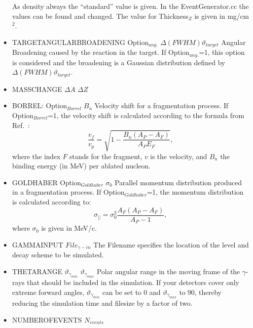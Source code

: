\documentclass[12pt]{book}
\begin{document}
\begin{itemize}
  As density always the ``standard'' value is given. In the EventGenerator.cc the values can be found and changed.
  The value for Thickness$_{Z}$ is given in mg/cm$^{2}$.
\item TARGETANGULARBROADENING Option$_{ang.}$ $\Delta (FWHM) \vartheta_{target}$\hfill{} \linebreak 
  Angular Broadening caused by the reaction in the target. If Option$_{ang.}$=1,
  this option is considered and the broadening is a Gaussian distribution defined by $\Delta (FWHM) \vartheta_{target}$.
\item MASSCHANGE $\Delta A$ $\Delta Z$\hfill{} \linebreak
\item BORREL: Option$_{Borrel}$ $B_{n}$\hfill{} \linebreak
  Velocity shift for a fragmentation process. If Option$_{Borrel}$=1, the velocity shift is calculated according
  to the formula from Ref.~\cite{BORREL}:
  \begin{equation}
    \frac{v_{f}}{v_{p}} = \sqrt{1-\frac{B_{n}(A_{P}-A_{F})}{A_{P}E_{F}}},
  \end{equation}
  where the index $F$ stands for the fragment,  $v$ is the velocity, 
  and $B_n$ the binding energy (in MeV) per ablated nucleon.
\item GOLDHABER Option$_{Goldhaber}$ $\sigma_{0}$\hfill{} \linebreak
  Parallel momentum distribution produced in a fragmentation process. If Option$_{Goldhaber}$=1, the momentum 
  distribution is calculated according to: 
  \begin{equation}
    \sigma_{||}=\sigma_{0}^{2} \frac{A_{F}(A_{P}-A_{F})}{A_{P}-1},
  \end{equation}
  where $\sigma_{0}$ is given in MeV/c.
\item GAMMAINPUT $File_{\gamma-in}$\hfill{} \linebreak
  The Filename specifies the location of the level and decay scheme to be simulated.
\item THETARANGE $\vartheta_{\gamma_{min}}$ $\vartheta_{\gamma_{max}}$\hfill{} \linebreak
  Polar angular range in the moving frame of the $\gamma$-rays that should be included in the simulation. 
  If your detectors cover only extreme forward angles, $\vartheta_{\gamma_{min}}$ can be set to 0 and 
  $\vartheta_{\gamma_{max}}$ to 90, thereby reducing the simulation time and filesize by a factor of two.
\item NUMBEROFEVENTS $N_{events}$\hfill{} \linebreak

\end{itemize}
\end{document}
